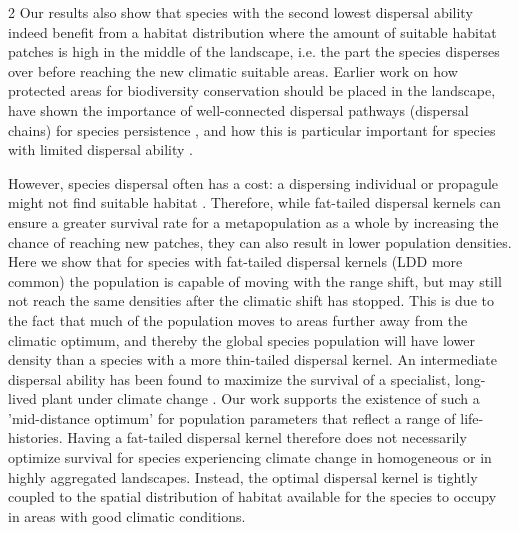 \documentclass[12pt,pdftex]{article}
\begin{document}
\begin{spacing}{2}
Our results also show that species with the second lowest dispersal ability indeed benefit from a habitat distribution where the amount of suitable habitat patches is high in the middle of the landscape, i.e. the part the species disperses over before reaching the new climatic suitable areas. Earlier work on how protected areas for biodiversity conservation should be placed in the landscape, have shown the importance of well-connected dispersal pathways (dispersal chains) for species persistence  \citep{Phillips2008}, and how this is particular important for species with limited dispersal ability \citep{Williams2005}. 

However, species dispersal often has a cost: a dispersing individual or propagule might not find suitable habitat \citep{Bonte2012}. Therefore, while fat-tailed dispersal kernels can ensure a greater survival rate for a metapopulation as a whole by increasing the chance of reaching new patches, they can also result in lower population densities. Here we show that for species with fat-tailed dispersal kernels (LDD more common) the population is capable of moving with the range shift, but may still not reach the same densities after the climatic shift has stopped. This is due to the fact that much of the population moves to areas further away from the climatic optimum, and thereby the global species population will have lower density than a species with a more thin-tailed dispersal kernel. An intermediate dispersal ability has been found to maximize the survival of a specialist, long-lived plant under climate change \citep{Perez-Garcia2017}. Our work supports the existence of such a 'mid-distance optimum' for population parameters that reflect a range of life-histories. Having a fat-tailed dispersal kernel therefore does not necessarily optimize survival for species experiencing climate change in homogeneous or in highly aggregated landscapes. Instead, the optimal dispersal kernel is tightly coupled to the spatial distribution of habitat available for the species to occupy in areas with good climatic conditions. 



\end{spacing}
\end{document}
